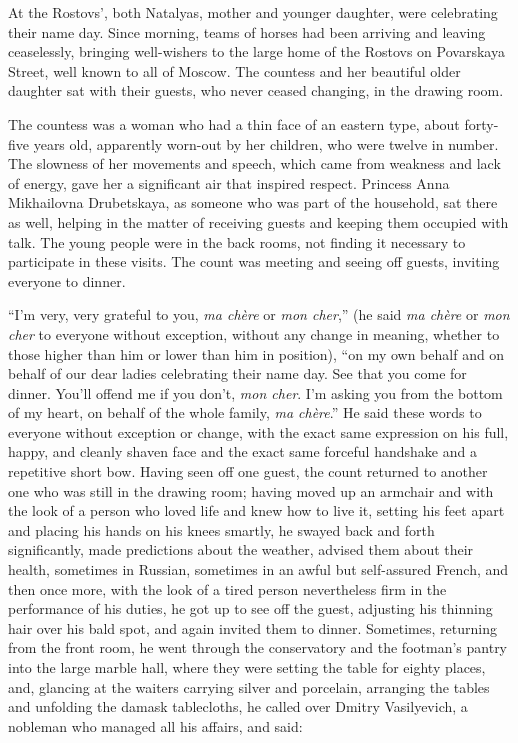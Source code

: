At the Rostovs', both Natalyas, mother and younger daughter, were celebrating their name day. Since morning, teams of horses had been arriving and leaving ceaselessly, bringing well-wishers to the large home of the Rostovs on Povarskaya Street, well known to all of Moscow. The countess and her beautiful older daughter sat with their guests, who never ceased changing, in the drawing room.

The countess was a woman who had a thin face of an eastern type, about forty-five years old, apparently worn-out by her children, who were twelve in number. The slowness of her movements and speech, which came from weakness and lack of energy, gave her a significant air that inspired respect. Princess Anna Mikhailovna Drubetskaya, as someone who was part of the household, sat there as well, helping in the matter of receiving guests and keeping them occupied with talk. The young people were in the back rooms, not finding it necessary to participate in these visits. The count was meeting and seeing off guests, inviting everyone to dinner.

``I'm very, very grateful to you, \textit{ma ch\`ere} or \textit{mon cher},'' (he said \textit{ma ch\`ere} or \textit{mon cher} to everyone without exception, without any change in meaning, whether to those higher than him or lower than him in position), ``on my own behalf and on behalf of our dear ladies celebrating their name day. See that you come for dinner. You'll offend me if you don't, \textit{mon cher}. I'm asking you from the bottom of my heart, on behalf of the whole family, \textit{ma ch\`ere}.'' He said these words to everyone without exception or change, with the exact same expression on his full, happy, and cleanly shaven face and the exact same forceful handshake and a repetitive short bow. Having seen off one guest, the count returned to another one who was still in the drawing room; having moved up an armchair and with the look of a person who loved life and knew how to live it, setting his feet apart and placing his hands on his knees smartly, he swayed back and forth significantly, made predictions about the weather, advised them about their health, sometimes in Russian, sometimes in an awful but self-assured French, and then once more, with the look of a tired person nevertheless firm in the performance of his duties, he got up to see off the guest, adjusting his thinning hair over his bald spot, and again invited them to dinner. Sometimes, returning from the front room, he went through the conservatory and the footman's pantry into the large marble hall, where they were setting the table for eighty places, and, glancing at the waiters carrying silver and porcelain, arranging the tables and unfolding the damask tablecloths, he called over Dmitry Vasilyevich, a nobleman who managed all his affairs, and said: %

